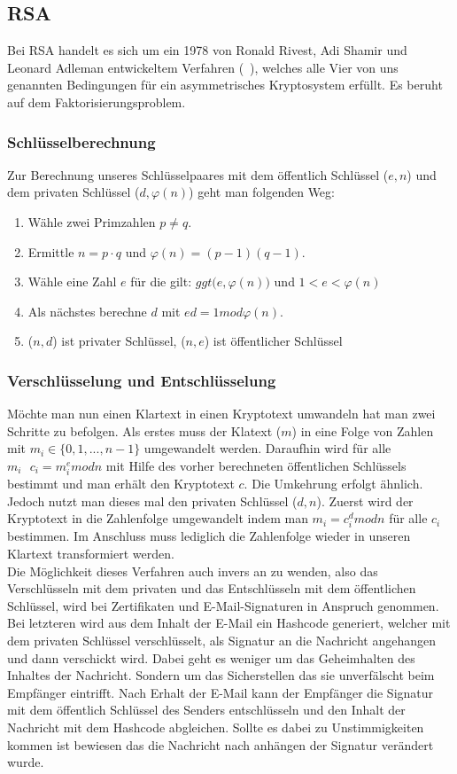 \documentclass[paper=a4,11pt,german]{scrartcl} %
\begin{document}
\subsection{RSA}
Bei RSA handelt es sich um ein 1978 von Ronald Rivest, Adi Shamir und Leonard Adleman entwickeltem Verfahren (~\cite{Eckert13}), welches   alle Vier von uns genannten Bedingungen für ein asymmetrisches Kryptosystem erfüllt. Es beruht auf dem Faktorisierungsproblem.

\subsubsection{Schlüsselberechnung}
Zur Berechnung unseres Schlüsselpaares mit dem öffentlich Schlüssel ($e,n$) und dem privaten Schlüssel ($d,\varphi(n)$) geht man folgenden Weg:
\begin{enumerate}
\item Wähle zwei Primzahlen $p\neq q$.
\item Ermittle $n = p \cdot q$ und $\varphi(n) = (p-1)(q-1)$.
\item Wähle eine Zahl $e$ für die gilt: $ggt\Big(e,\varphi(n)\Big)$ und $1<e<\varphi(n)$
\item Als nächstes berechne $d$ mit $ed = 1 mod \varphi(n)$.
\item ($n,d$) ist privater Schlüssel, ($n,e$) ist öffentlicher Schlüssel
\end{enumerate} \cite{Eckert13}

\subsubsection{Verschlüsselung und Entschlüsselung}
Möchte man nun einen Klartext in einen Kryptotext umwandeln hat man zwei Schritte zu befolgen. Als erstes muss der Klatext ($m$) in eine Folge von Zahlen mit $m_i \in \{0,1,...,n-1\}$ umgewandelt werden. Daraufhin wird für alle $m_i~~~c_i=m^e_i mod n$ mit Hilfe des vorher berechneten öffentlichen Schlüssels bestimmt und man erhält den Kryptotext $c$. %
Die Umkehrung erfolgt ähnlich. Jedoch nutzt man dieses mal den privaten Schlüssel ($d,n$). Zuerst wird der Kryptotext in die Zahlenfolge umgewandelt indem man $m_i = c^d_i mod n$ für alle $c_i$ bestimmen. Im Anschluss muss lediglich die Zahlenfolge wieder in unseren Klartext transformiert werden.
\ \\

Die Möglichkeit dieses Verfahren auch invers an zu wenden, also das Verschlüsseln mit dem privaten und das Entschlüsseln mit dem öffentlichen Schlüssel, wird bei Zertifikaten und E-Mail-Signaturen in Anspruch genommen. Bei letzteren wird aus dem Inhalt der E-Mail ein Hashcode generiert, welcher mit dem privaten Schlüssel verschlüsselt, als Signatur an die Nachricht angehangen und dann verschickt wird. Dabei geht es weniger um das Geheimhalten des Inhaltes der Nachricht. Sondern um das Sicherstellen das sie unverfälscht beim Empfänger eintrifft. Nach Erhalt der E-Mail kann der Empfänger die Signatur mit dem öffentlich Schlüssel des Senders entschlüsseln und den Inhalt der Nachricht mit dem Hashcode abgleichen. Sollte es dabei zu Unstimmigkeiten kommen ist bewiesen das die Nachricht nach anhängen der Signatur verändert wurde.
\end{document}
